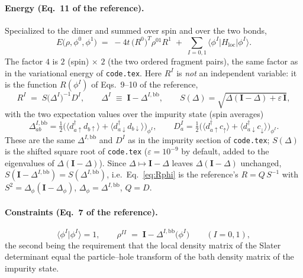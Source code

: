 \documentclass[11pt]{article}
\newcommand{\Hloc}{H_{\mathrm{loc}}}
\newcommand{\Ybb}{\Delta^{I,\mathrm{bb}}}
\begin{document}
\paragraph{Energy (Eq.~11 of the reference).} Specialized to the dimer and summed over
spin and over the two bonds,
\begin{equation}
  \boxed{\;
  E\bigl(\rho,\phi^{0},\phi^{1}\bigr)
  \;=\; -4t\,\bigl(R^{0}\bigr)^{T}\rho^{01}R^{1}
        \;+\;\sum_{I=0,1}\langle\phi^{I}|\Hloc|\phi^{I}\rangle .\;}
  \label{eq:Eni}
\end{equation}
The factor $4$ is $2$ (spin) $\times$ $2$ (the two ordered fragment pairs), the same factor
as in the variational energy of \texttt{code.tex}. Here $R^{I}$ is \emph{not} an
independent variable: it is the function $R(\phi^{I})$ of Eqs.~9--10 of the reference,
\begin{equation}
  R^{I} \;=\; S\bigl(\Delta^{I}\bigr)^{-1}D^{I},\qquad
  \Delta^{I}\;\equiv\;\mathbf I-\Ybb,\qquad
  S(\Delta)=\sqrt{\Delta(\mathbf I-\Delta)+\varepsilon\,\mathbf I},
  \label{eq:Rphi}
\end{equation}
with the two expectation values over the impurity state (spin averages)
\begin{equation}
  \Ybb_{ab}=\tfrac12\bigl(\langle d^{\dagger}_{a\uparrow}d_{b\uparrow}\rangle
     +\langle d^{\dagger}_{a\downarrow}d_{b\downarrow}\rangle\bigr)_{\phi^I},\qquad
  D^{I}_{a}=\tfrac12\bigl(\langle d^{\dagger}_{a\uparrow}c_{\uparrow}\rangle
     +\langle d^{\dagger}_{a\downarrow}c_{\downarrow}\rangle\bigr)_{\phi^I}.
  \label{eq:DbbD}
\end{equation}
These are the same $\Delta^{I,\mathrm{bb}}$ and $D^I$ as in the impurity section of
\texttt{code.tex}; $S(\Delta)$ is the shifted square root of \texttt{code.tex}
($\varepsilon=10^{-9}$ by default, added to the eigenvalues of $\Delta(\mathbf I-\Delta)$).
Since $\Delta\mapsto\mathbf I-\Delta$ leaves $\Delta(\mathbf I-\Delta)$ unchanged,
$S(\mathbf I-\Ybb)=S(\Ybb)$, i.e.\ Eq.~\eqref{eq:Rphi} is the reference's
$R=Q\,S^{-1}$ with $S^2=\Delta_\phi(\mathbf I-\Delta_\phi)$, $\Delta_\phi=\Ybb$, $Q=D$.

\paragraph{Constraints (Eq.~7 of the reference).}
\begin{equation}
  \langle\phi^{I}|\phi^{I}\rangle=1,\qquad
  \rho^{II}\;=\;\mathbf I-\Ybb\bigl(\phi^{I}\bigr)\qquad(I=0,1),
  \label{eq:constraints}
\end{equation}
the second being the requirement that the local density matrix of the Slater determinant
equal the particle--hole transform of the bath density matrix of the impurity state.
\end{document}
